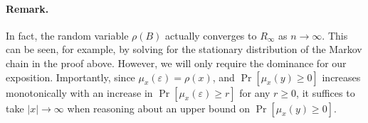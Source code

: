   \paragraph{Remark.} 
  In fact, the random variable $\rho(B)$
  actually converges to $R_\infty$ as $n \rightarrow \infty$. 
  This can be seen, for example, 
  by solving for the stationary distribution of the Markov chain in the proof above. 
  However, we will only require the dominance for our exposition. 
  Importantly, since $\mu_x(\varepsilon) = \rho(x)$, and 
  $\Pr[\mu_x(y) \geq 0]$ increases monotonically 
  with an increase in $\Pr[\mu_x(\varepsilon) \geq r]$ for any $r \geq 0$, 
  it suffices to take $|x| \rightarrow \infty$ 
  when reasoning about an upper bound on $\Pr[\mu_x(y) \geq 0]$.